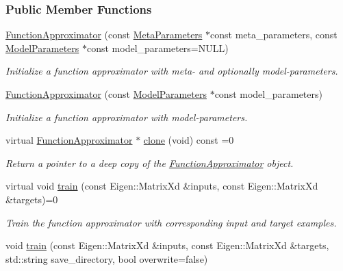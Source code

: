 \subsubsection*{Public Member Functions}
\begin{DoxyCompactItemize}
\item 
\hyperlink{classDmpBbo_1_1FunctionApproximator_ac004d40032d032dd823d8b41a2b09e4f}{Function\+Approximator} (const \hyperlink{classDmpBbo_1_1MetaParameters}{Meta\+Parameters} $\ast$const meta\+\_\+parameters, const \hyperlink{classDmpBbo_1_1ModelParameters}{Model\+Parameters} $\ast$const model\+\_\+parameters=N\+U\+L\+L)
\begin{DoxyCompactList}\small\item\em Initialize a function approximator with meta-\/ and optionally model-\/parameters. \end{DoxyCompactList}\item 
\hyperlink{classDmpBbo_1_1FunctionApproximator_a7c402c9ebf0e21c94686f516f29a3a94}{Function\+Approximator} (const \hyperlink{classDmpBbo_1_1ModelParameters}{Model\+Parameters} $\ast$const model\+\_\+parameters)
\begin{DoxyCompactList}\small\item\em Initialize a function approximator with model-\/parameters. \end{DoxyCompactList}\item 
virtual \hyperlink{classDmpBbo_1_1FunctionApproximator}{Function\+Approximator} $\ast$ \hyperlink{classDmpBbo_1_1FunctionApproximator_a9b6a690060f1d845da16d6d739ded2d9}{clone} (void) const =0
\begin{DoxyCompactList}\small\item\em Return a pointer to a deep copy of the \hyperlink{classDmpBbo_1_1FunctionApproximator}{Function\+Approximator} object. \end{DoxyCompactList}\item 
virtual void \hyperlink{classDmpBbo_1_1FunctionApproximator_a9781476c7d296da4aaf50e74cd273a75}{train} (const Eigen\+::\+Matrix\+Xd \&inputs, const Eigen\+::\+Matrix\+Xd \&targets)=0
\begin{DoxyCompactList}\small\item\em Train the function approximator with corresponding input and target examples. \end{DoxyCompactList}\item 
void \hyperlink{classDmpBbo_1_1FunctionApproximator_a50db3d6c1ccf602d390aa5a4b297704d}{train} (const Eigen\+::\+Matrix\+Xd \&inputs, const Eigen\+::\+Matrix\+Xd \&targets, std\+::string save\+\_\+directory, bool overwrite=false)

\end{DoxyCompactItemize}
